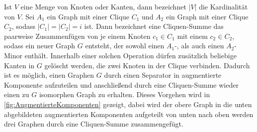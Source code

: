 Ist $V$ eine Menge von Knoten oder Kanten, dann bezeichnet $\vert V \vert$ die Kardinalität von $V$.
Sei $A_1$ ein Graph mit einer Clique $C_1$ und $A_2$ ein Graph mit einer Clique $C_2$, sodass $\vert C_1 \vert = \vert C_2 \vert = i$ ist.
Dann bezeichnet eine Cliquen-Summe das paarweise Zusammenfügen von je einem Knoten $c_1 \in C_1$ mit einem $c_2 \in C_2$, sodass ein neuer Graph $G$ entsteht, der sowohl einen $A_1$-, als auch einen $A_2$-Minor enthält.
Innerhalb einer solchen Operation dürfen zusätzlich beliebige Kanten in $G$ gelöscht werden, die zwei Knoten in der Clique verbinden.
Dadurch ist es möglich, einen Graphen $G$ durch einen Separator in augmentierte Komponente aufzuteilen und anschließend durch eine Cliquen-Summe wieder einen zu $G$ isomorphen Graph zu erhalten.
Dieses Vorgehen wird in \Abb \ref{fig:AugmentierteKomponenten} gezeigt, dabei wird der obere Graph in die unten abgebildeten augmentierten Komponenten aufgeteilt \bzw von unten nach oben werden drei Graphen durch eine Cliquen-Summe zusammengefügt.
